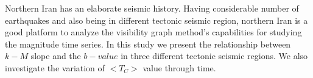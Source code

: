 \noindent
Northern Iran has an elaborate seismic history.  Having considerable number of earthquakes and also being in different tectonic seismic region, northern Iran is a good platform to analyze the visibility graph method's capabilities for studying the magnitude time series. In this study we present the relationship between $k-M$ slope and the $b-value$ in three different tectonic seismic regions. We also investigate the variation of $<T_C>$ value through time.


